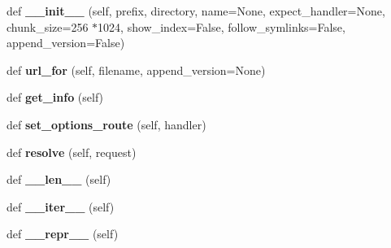 \begin{DoxyCompactItemize}
\item 
\mbox{\label{classaiohttp_1_1web__urldispatcher_1_1_static_resource_a1aa2fcfa7460d4ba1121fcda45213c43}} 
def {\bfseries \+\_\+\+\_\+init\+\_\+\+\_\+} (self, prefix, directory, name=None, expect\+\_\+handler=None, chunk\+\_\+size=256 $\ast$1024, show\+\_\+index=False, follow\+\_\+symlinks=False, append\+\_\+version=False)
\item 
\mbox{\label{classaiohttp_1_1web__urldispatcher_1_1_static_resource_ace89dff10d9ab7af771ae1478d517b86}} 
def {\bfseries url\+\_\+for} (self, filename, append\+\_\+version=None)
\item 
\mbox{\label{classaiohttp_1_1web__urldispatcher_1_1_static_resource_afdfb7c8aefd0a75e263079b20472b427}} 
def {\bfseries get\+\_\+info} (self)
\item 
\mbox{\label{classaiohttp_1_1web__urldispatcher_1_1_static_resource_adaee51b424d4cf439d80059e985510c6}} 
def {\bfseries set\+\_\+options\+\_\+route} (self, handler)
\item 
\mbox{\label{classaiohttp_1_1web__urldispatcher_1_1_static_resource_a5264e18bde33f3c512bac51fc156e0d0}} 
def {\bfseries resolve} (self, request)
\item 
\mbox{\label{classaiohttp_1_1web__urldispatcher_1_1_static_resource_a00ff2c1e2998727ad1ef06d1e16fe047}} 
def {\bfseries \+\_\+\+\_\+len\+\_\+\+\_\+} (self)
\item 
\mbox{\label{classaiohttp_1_1web__urldispatcher_1_1_static_resource_a3e3a4b755ca29084640c4aa0455cf7c3}} 
def {\bfseries \+\_\+\+\_\+iter\+\_\+\+\_\+} (self)
\item 
\mbox{\label{classaiohttp_1_1web__urldispatcher_1_1_static_resource_ad3cfd09ad2e6572d323463447e977633}} 
def {\bfseries \+\_\+\+\_\+repr\+\_\+\+\_\+} (self)
\end{DoxyCompactItemize}
